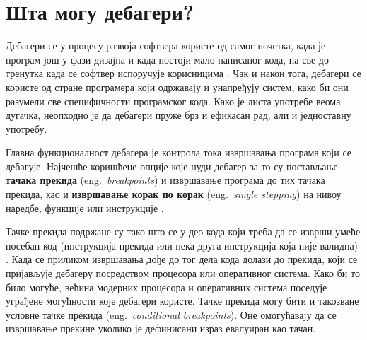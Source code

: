 \documentclass[a4paper]{article}
\begin{document}
\section{Шта могу дебагери?}
\label{sec:whatCanDebuggersDo}

Дебагери се у процесу развоја софтвера користе од самог почетка, 
када је програм још у фази дизајна и када постоји мало написаног
кода, па све до тренутка када се софтвер испоручује корисницима \cite{debuggersForProgrammingLanguages}.
Чак и након тога, дебагери се користе од стране програмера који 
одржавају и унапређују систем, како би они разумели све 
специфичности програмског кода. Како је листа употребе веома дугачка, неопходно
је да дебагери пруже брз и ефикасан рад, али и једноставну употребу.

Главна функционалност дебагера је контрола тока извршавања програма 
који се дебагује. Најчешће коришћене опције које нуди дебагер за то
су постављање \textbf{тачака прекида} (eng.~{\em breakpoints}) 
и извршавање програма до тих тачака прекида, као
и \textbf{извршавање корак по корак} (eng.~{\em single stepping}) на нивоу наредбе, функције или
инструкције \cite{debuggersForProgrammingLanguages}.

Тачке прекида подржане су тако што се у део кода који треба 
да се изврши умеће посебан код (инструкција прекида или нека 
друга инструкција која није валидна) \cite{debuggingTechniques}. Када се приликом извршавања
дође до тог дела кода долази до прекида, који се пријављује 
дебагеру посредством процесора или оперативног система. 
Како би то било могуће, већина модерних
процесора и оперативних система поседује уграђене 
могућности које дебагери користе.
Тачке прекида могу бити и такозване условне тачке прекида (eng.~{\em conditional breakpoints}).
Оне омогућавају да се извршавање прекине уколико
је дефинисани израз евалуиран као тачан.
\end{document}
